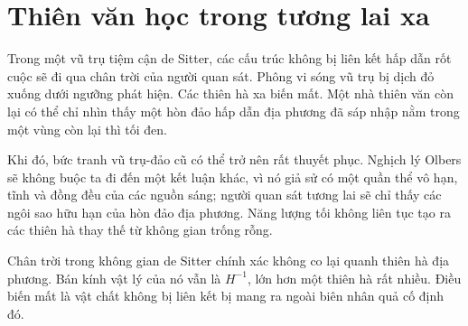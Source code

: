 \section{Thiên văn học trong tương lai xa}

Trong một vũ trụ tiệm cận de Sitter, các cấu trúc không bị liên kết hấp dẫn rốt cuộc sẽ đi qua chân trời của người quan sát. Phông vi sóng vũ trụ bị dịch đỏ xuống dưới ngưỡng phát hiện. Các thiên hà xa biến mất. Một nhà thiên văn còn lại có thể chỉ nhìn thấy một hòn đảo hấp dẫn địa phương đã sáp nhập nằm trong một vùng còn lại thì tối đen.

\begin{classroomqa}
\end{classroomqa}

Khi đó, bức tranh vũ trụ-đảo cũ có thể trở nên rất thuyết phục. Nghịch lý Olbers sẽ không buộc ta đi đến một kết luận khác, vì nó giả sử có một quần thể vô hạn, tĩnh và đồng đều của các nguồn sáng; người quan sát tương lai sẽ chỉ thấy các ngôi sao hữu hạn của hòn đảo địa phương. Năng lượng tối không liên tục tạo ra các thiên hà thay thế từ không gian trống rỗng.

Chân trời trong không gian de Sitter chính xác không co lại quanh thiên hà địa phương. Bán kính vật lý của nó vẫn là \(H^{-1}\), lớn hơn một thiên hà rất nhiều. Điều biến mất là vật chất không bị liên kết bị mang ra ngoài biên nhân quả cố định đó.

\begin{classroomqa}
\end{classroomqa}

\begin{classroomqa}
\end{classroomqa}

